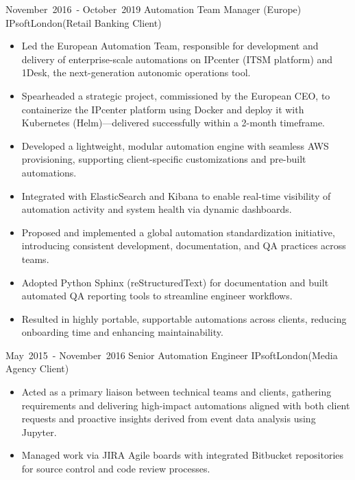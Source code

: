 \cventry %
  {\mbox{November 2016 -} \mbox{October 2019}}
  {Automation Team Manager (Europe)}
  {IPsoft}{London}{(Retail Banking Client)}
  { 
    \begin{itemize}
     \item Led the European Automation Team, responsible for development and delivery of enterprise-scale automations on IPcenter (ITSM platform) and 1Desk, the next-generation autonomic operations tool.
     \item Spearheaded a strategic project, commissioned by the European CEO, to containerize the IPcenter platform using Docker and deploy it with Kubernetes (Helm)—delivered successfully within a 2-month timeframe.
     \item Developed a lightweight, modular automation engine with seamless AWS provisioning, supporting client-specific customizations and pre-built automations.
     \item Integrated with ElasticSearch and Kibana to enable real-time visibility of automation activity and system health via dynamic dashboards.
     \item Proposed and implemented a global automation standardization initiative, introducing consistent development, documentation, and QA practices across teams.
     \item Adopted Python Sphinx (reStructuredText) for documentation and built automated QA reporting tools to streamline engineer workflows.
     \item Resulted in highly portable, supportable automations across clients, reducing onboarding time and enhancing maintainability.
    \end{itemize}
    \bigskip
  }

\cventry %
  {\mbox{May 2015 -} \mbox{November 2016}}
  {Senior Automation Engineer}
  {IPsoft}{London}{(Media Agency Client)}
  {
    \begin{itemize}
     \item Acted as a primary liaison between technical teams and clients, gathering requirements and delivering high-impact automations aligned with both client requests and proactive insights derived from event data analysis using Jupyter.
     \item Managed work via JIRA Agile boards with integrated Bitbucket repositories for source control and code review processes. 
    \end{itemize}
    \bigskip
  }

